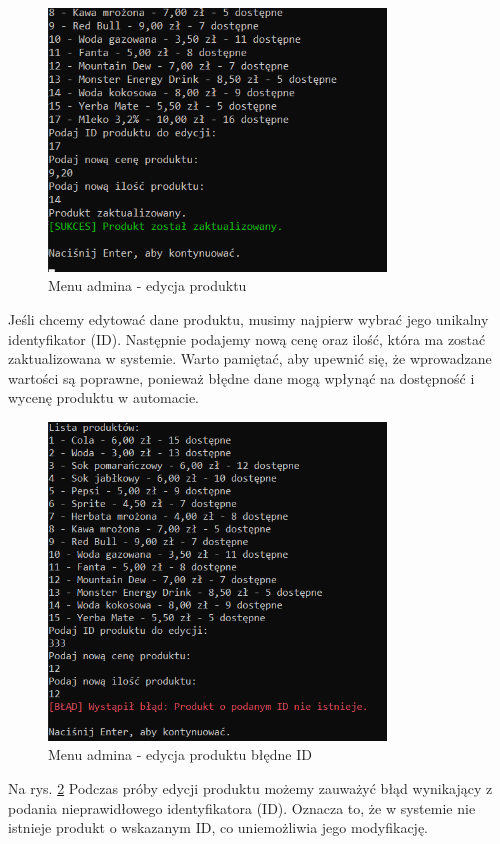 \newpage


\begin{figure}[H] 
    \centering
    \includegraphics[width=0.8\textwidth]{grafiki/edycja_produktu.png}
    \caption{\footnotesize Menu admina - edycja produktu}	
    \label{fig:5.12}
\end{figure}
Jeśli chcemy edytować dane produktu, musimy najpierw wybrać jego unikalny identyfikator (ID). Następnie podajemy nową cenę oraz ilość, która ma zostać zaktualizowana w systemie. Warto pamiętać, aby upewnić się, że wprowadzane wartości są poprawne, ponieważ błędne dane mogą wpłynąć na dostępność i wycenę produktu w automacie.

\newpage

\begin{figure}[H] 
    \centering
    \includegraphics[width=0.8\textwidth]{grafiki/blad_id_edycja.png}
    \caption{\footnotesize Menu admina - edycja produktu błędne ID}	
    \label{fig:5.13}
\end{figure}
Na rys. \ref{fig:5.13} Podczas próby edycji produktu możemy zauważyć błąd wynikający z podania nieprawidłowego identyfikatora (ID). Oznacza to, że w systemie nie istnieje produkt o wskazanym ID, co uniemożliwia jego modyfikację.

